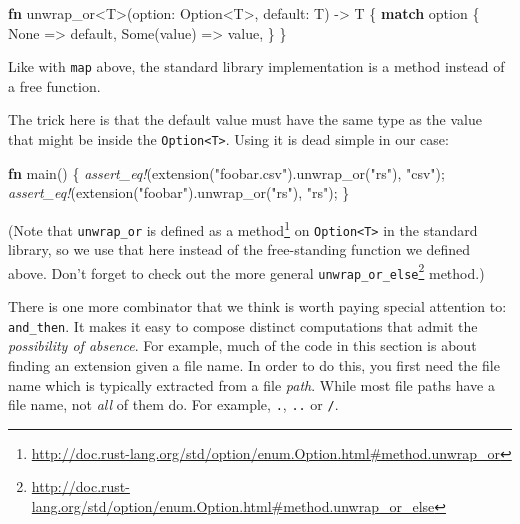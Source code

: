 \documentclass[a4paper,]{book}
\newenvironment{Shaded}{\begin{snugshade}}{\end{snugshade}}
\newcommand{\KeywordTok}[1]{\textcolor[rgb]{0.13,0.29,0.53}{\textbf{{#1}}}}
\newcommand{\DataTypeTok}[1]{\textcolor[rgb]{0.13,0.29,0.53}{{#1}}}
\newcommand{\ConstantTok}[1]{\textcolor[rgb]{0.00,0.00,0.00}{{#1}}}
\newcommand{\StringTok}[1]{\textcolor[rgb]{0.31,0.60,0.02}{{#1}}}
\newcommand{\PreprocessorTok}[1]{\textcolor[rgb]{0.56,0.35,0.01}{\textit{{#1}}}}
\newcommand{\NormalTok}[1]{{#1}}
\renewcommand{\href}[2]{#2\footnote{\url{#1}}}
\begin{document}
\begin{Shaded}
\begin{Highlighting}[]
\KeywordTok{fn} \NormalTok{unwrap_or<T>(option: }\DataTypeTok{Option}\NormalTok{<T>, default: T) -> T \{}
    \KeywordTok{match} \NormalTok{option \{}
        \ConstantTok{None} \NormalTok{=> default,}
        \ConstantTok{Some}\NormalTok{(value) => value,}
    \NormalTok{\}}
\NormalTok{\}}
\end{Highlighting}
\end{Shaded}

Like with \texttt{map} above, the standard library implementation is a
method instead of a free function.

The trick here is that the default value must have the same type as the
value that might be inside the
\texttt{Option\textless{}T\textgreater{}}. Using it is dead simple in
our case:

\begin{Shaded}
\begin{Highlighting}[]
\KeywordTok{fn} \NormalTok{main() \{}
    \PreprocessorTok{assert_eq!}\NormalTok{(extension(}\StringTok{"foobar.csv"}\NormalTok{).unwrap_or(}\StringTok{"rs"}\NormalTok{), }\StringTok{"csv"}\NormalTok{);}
    \PreprocessorTok{assert_eq!}\NormalTok{(extension(}\StringTok{"foobar"}\NormalTok{).unwrap_or(}\StringTok{"rs"}\NormalTok{), }\StringTok{"rs"}\NormalTok{);}
\NormalTok{\}}
\end{Highlighting}
\end{Shaded}

(Note that \texttt{unwrap\_or} is
\href{http://doc.rust-lang.org/std/option/enum.Option.html\#method.unwrap_or}{defined
as a method} on \texttt{Option\textless{}T\textgreater{}} in the
standard library, so we use that here instead of the free-standing
function we defined above. Don't forget to check out the more general
\href{http://doc.rust-lang.org/std/option/enum.Option.html\#method.unwrap_or_else}{\texttt{unwrap\_or\_else}}
method.)

There is one more combinator that we think is worth paying special
attention to: \texttt{and\_then}. It makes it easy to compose distinct
computations that admit the \emph{possibility of absence}. For example,
much of the code in this section is about finding an extension given a
file name. In order to do this, you first need the file name which is
typically extracted from a file \emph{path}. While most file paths have
a file name, not \emph{all} of them do. For example, \texttt{.},
\texttt{..} or \texttt{/}.
\end{document}
